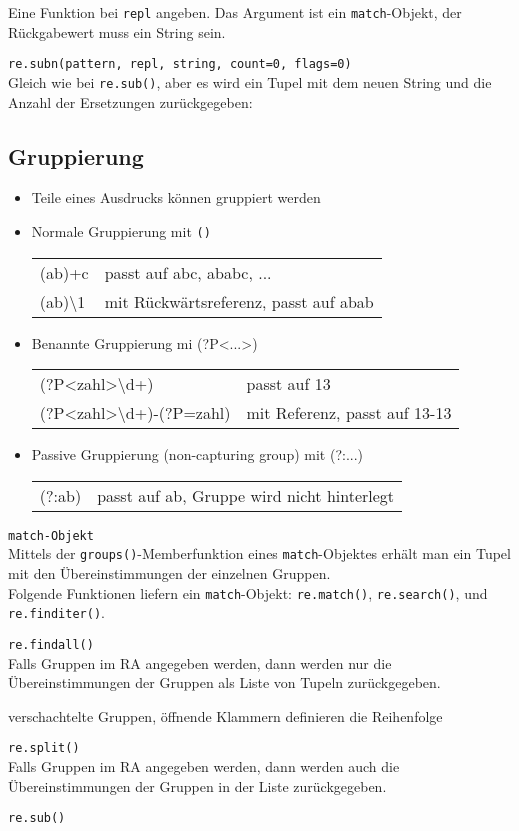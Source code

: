 \pagebreak[1]
Eine Funktion bei \texttt{repl} angeben. Das Argument ist ein \texttt{match}-Objekt, der Rückgabewert muss ein String sein.

\texttt{re.subn(pattern, repl, string, count=0, flags=0)}\\
Gleich wie bei \texttt{re.sub()}, aber es wird ein Tupel mit dem neuen String und die Anzahl der Ersetzungen zurückgegeben:


\subsection{Gruppierung}
\begin{itemize}
	\item Teile eines Ausdrucks können gruppiert werden
	\item Normale Gruppierung mit \texttt{()}\\
	\begin{tabular}{ll}
		(ab)+c& passt auf abc, ababc, ...\\
		(ab)\textbackslash1& mit Rückwärtsreferenz, passt auf abab\\
	\end{tabular}
	\item Benannte Gruppierung mi (?P<...>)\\
	\begin{tabular}{ll}
		(?P<zahl>\textbackslash d+)& passt auf 13\\
		(?P<zahl>\textbackslash d+)-(?P=zahl)& mit Referenz, passt auf 13-13\\
	\end{tabular}
	\item Passive Gruppierung (non-capturing group) mit (?:...)\\
	\begin{tabular}{ll}
		(?:ab)& passt auf ab, Gruppe wird nicht hinterlegt\\
	\end{tabular}
\end{itemize}

\texttt{match-Objekt}\\
Mittels der \texttt{groups()}-Memberfunktion eines \texttt{match}-Objektes erhält man ein Tupel mit den Übereinstimmungen der einzelnen Gruppen.\\
Folgende Funktionen liefern ein \texttt{match}-Objekt: \texttt{re.match()}, \texttt{re.search()}, und \texttt{re.finditer()}.


\texttt{re.findall()}\\
Falls Gruppen im RA angegeben werden, dann werden nur die Übereinstimmungen der Gruppen als Liste von Tupeln zurückgegeben.

verschachtelte Gruppen, öffnende Klammern definieren die Reihenfolge

\texttt{re.split()}\\
Falls Gruppen im RA angegeben werden, dann werden auch die Übereinstimmungen der Gruppen in der Liste zurückgegeben.

\texttt{re.sub()}\\


